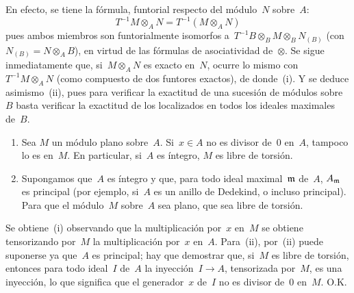 En efecto, se tiene la fórmula, funtorial respecto del módulo~$N$ sobre~$A$:
$$
T^{-1}M \otimes_{A} N=T^{-1}(M \otimes_{A} N)
$$
pues ambos miembros son funtorialmente isomorfos a~$T^{-1}B\otimes_BM\otimes_BN_{(B)}$ (con~$N_{(B)}=N\otimes_AB$), en virtud de las fórmulas de asociatividad de~$\otimes$. Se sigue inmediatamente que, si~$M\otimes_AN$ es exacto en~$N$, ocurre lo mismo con~$T^{-1}M\otimes_AN$ (como compuesto de dos funtores exactos), de donde~(i). Y se deduce asimismo~(ii), pues para verificar la exactitud de una sucesión de módulos sobre~$B$ basta verificar la exactitud de los localizados en todos los ideales maximales de~$B$.

\begin{proposition}
\label{IV.1.3}
\begin{enumerate}
\item[(i)] Sea
$M$ un módulo plano sobre~$A$. Si~$x\in A$ no es divisor de~$0$ en~$A$, tampoco lo es en~$M$. En particular, si~$A$ es íntegro, $M$ es libre de torsión.
\item[(ii)] Supongamos que~$A$ es íntegro y que, para todo ideal maximal~$\mathfrak{m}$ de~$A$, $A_{\mathfrak{m}}$ es principal (por ejemplo, si~$A$ es un anillo de Dedekind, o incluso principal). Para que el módulo~$M$ sobre~$A$ sea plano,  que sea libre de torsión.
\end{enumerate}
\end{proposition}

Se obtiene~(i) observando que la multiplicación por~$x$ en~$M$ se obtiene tensorizando por~$M$ la multiplicación por~$x$ en~$A$. Para~(ii), por~(ii) puede suponerse ya que~$A$ es principal; hay que demostrar que, si~$M$ es libre de torsión, entonces para todo ideal~$I$ de~$A$ la inyección~$I\to A$, tensorizada por~$M$, es una inyección, lo que significa que el generador~$x$ de~$I$ no es divisor de~$0$ en~$M$. O.K.
